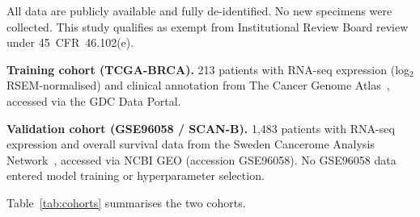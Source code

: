 \documentclass[review,12pt]{elsarticle}
\begin{document}
All data are publicly available and fully de-identified.  No new
specimens were collected.  This study qualifies as exempt from
Institutional Review Board review under 45~CFR~46.102(e).

\textbf{Training cohort (TCGA-BRCA).}
213 patients with RNA-seq expression (log$_2$ RSEM-normalised) and
clinical annotation from The Cancer Genome Atlas~\citep{tcga2012},
accessed via the GDC Data Portal.

\textbf{Validation cohort (GSE96058 / SCAN-B).}
1,483 patients with RNA-seq expression and overall survival data from
the Sweden Cancerome Analysis Network~\citep{saal2015,brueffer2018},
accessed via NCBI GEO (accession GSE96058).  No GSE96058 data entered
model training or hyperparameter selection.

Table~\ref{tab:cohorts} summarises the two cohorts.
\end{document}

